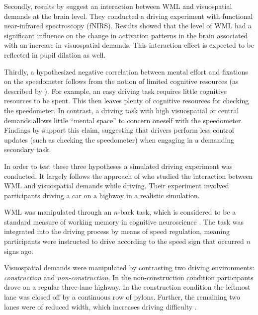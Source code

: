 Secondly, results by \citet{Scheunemann2019} suggest an interaction between WML and visuospatial demands at the brain level. 
They conducted a driving experiment with functional near-infrared spectroscopy (fNIRS).
Results showed that the level of WML had a significant influence on the change in activation patterns in the brain associated with an increase in visuospatial demands.
This interaction effect is expected to be reflected in pupil dilation as well.

Thirdly, a hypothesized negative correlation between mental effort and fixations on the speedometer follows from the notion of limited cognitive resources (as described by \citet{DeWaard1996}).
For example, an easy driving task requires little cognitive resources to be spent.
This then leaves plenty of cognitive resources for checking the speedometer.
In contrast, a driving task with high visuospatial or central demands allows little ``mental space'' to concern oneself with the speedometer.
Findings by \citep{Salvucci2011} support this claim, suggesting that drivers perform less control updates (such as checking the speedometer) when engaging in a demanding secondary task.

In order to test these three hypotheses a simulated driving experiment was conducted.
It largely follows the approach of \citet{Scheunemann2019} who studied the interaction between WML and visuospatial demands while driving.
Their experiment involved participants driving a car on a highway in a realistic simulation. 

WML was manipulated through an \(n\)-back task, which is considered to be a standard measure of working memory in cognitive neuroscience \citep{Kane2007}.
The task was integrated into the driving process by means of speed regulation, meaning participants were instructed to drive according to the speed sign that occurred \(n\) signs ago.

Visuospatial demands were manipulated by contrasting two driving environments: \textit{construction} and \textit{non-construction}.
In the non-construction condition participants drove on a regular three-lane highway.
In the construction condition the leftmost lane was closed off by a continuous row of pylons.
Further, the remaining two lanes were of reduced width, which increases driving difficulty \citep{Liu2016}.